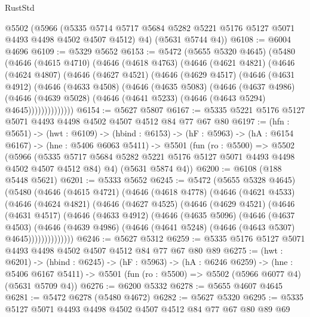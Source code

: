 \begin{lexlean}{RustStd}
\begin{coremodule}
{\begin{coremodule}
{{{{{{{{    @5502
      (@5966
        (@5335 @5714 @5717 @5684 @5282 @5221 @5176 @5127 @5071 @4493 @4498 @4502 @4507 @4512)
        @4)
      (@5631 @5744 @4))
@6108 := @6004 @4696
@6109 := @5329 @5652
@6153 := @5472
    (@5655 @5320 @4645)
    (@5480
      (@4646
        (@4615 @4710)
        (@4646
          (@4618 @4763)
          (@4646
            (@4621 @4821)
            (@4646
              (@4624 @4807)
              (@4646
                (@4627 @4521)
                (@4646
                  (@4629 @4517)
                  (@4646
                    (@4631 @4912)
                    (@4646
                      (@4633 @4508)
                      (@4646
                        (@4635 @5083)
                        (@4646
                          (@4637 @4986)
                          (@4646
                            (@4639 @5028)
                            (@4646 (@4641 @5233) (@4646 (@4643 @5294) @4645))))))))))))))
@6154 := @5627 @5807
@6167 := @5335 @5221 @5176 @5127 @5071 @4493 @4498 @4502 @4507 @4512 @84 @77 @67 @80
@6197 := (hfn : @5651) ->
  (hwt : @6109) ->
  (hbind : @6153) ->
  (hF : @5963) ->
  (hA : @6154 @6167) ->
  (hne : @5406 @6063 @5411) ->
  @5501
    (fun (ro : @5500) =>
    @5502
      (@5966 (@5335 @5717 @5684 @5282 @5221 @5176 @5127 @5071 @4493 @4498 @4502 @4507 @4512 @84) @4)
      (@5631 @5874 @4))
@6200 := @6108 (@188 @5448 @5621)
@6201 := @5333 @5652
@6245 := @5472
    (@5655 @5328 @4645)
    (@5480
      (@4646
        (@4615 @4721)
        (@4646
          (@4618 @4778)
          (@4646
            (@4621 @4533)
            (@4646
              (@4624 @4821)
              (@4646
                (@4627 @4525)
                (@4646
                  (@4629 @4521)
                  (@4646
                    (@4631 @4517)
                    (@4646
                      (@4633 @4912)
                      (@4646
                        (@4635 @5096)
                        (@4646
                          (@4637 @4503)
                          (@4646
                            (@4639 @4986)
                            (@4646 (@4641 @5248) (@4646 (@4643 @5307) @4645))))))))))))))
@6246 := @5627 @5312
@6259 := @5335 @5176 @5127 @5071 @4493 @4498 @4502 @4507 @4512 @84 @77 @67 @80 @89
@6275 := (hwt : @6201) ->
  (hbind : @6245) ->
  (hF : @5963) ->
  (hA : @6246 @6259) ->
  (hne : @5406 @6167 @5411) -> @5501 (fun (ro : @5500) => @5502 (@5966 @6077 @4) (@5631 @5709 @4))
@6276 := @6200 @5332
@6278 := @5655 @4607 @4645
@6281 := @5472 @6278 (@5480 @4672)
@6282 := @5627 @5320
@6295 := @5335 @5127 @5071 @4493 @4498 @4502 @4507 @4512 @84 @77 @67 @80 @89 @69
}}}}}}}}
\end{coremodule}}
\end{coremodule}
\end{lexlean}
